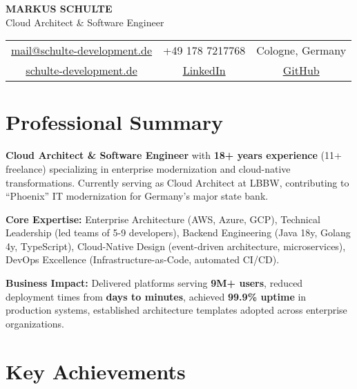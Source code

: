 \documentclass[10pt,a4paper]{article}
\begin{document}
\begin{center}
{\LARGE\bfseries\color{headercolor} MARKUS SCHULTE} \\[4pt]
{\large Cloud Architect \& Software Engineer} \\[8pt]
\begin{tabular}{c|c|c}
\href{mailto:mail@schulte-development.de}{mail@schulte-development.de} & 
+49 178 7217768 & 
Cologne, Germany \\
\href{https://schulte-development.de}{schulte-development.de} & 
\href{https://www.linkedin.com/in/markus-schulte/}{LinkedIn} & 
\href{https://github.com/SchulteDev}{GitHub}
\end{tabular}
\end{center}

\vspace{8pt}

\section{Professional Summary}

\textbf{Cloud Architect \& Software Engineer} with \textbf{18+ years experience} (11+ freelance) specializing in enterprise modernization and cloud-native transformations. Currently serving as Cloud Architect at LBBW, contributing to ``Phoenix'' IT modernization for Germany's major state bank.

\textbf{Core Expertise:} Enterprise Architecture (AWS, Azure, GCP), Technical Leadership (led teams of 5-9 developers), Backend Engineering (Java 18y, Golang 4y, TypeScript), Cloud-Native Design (event-driven architecture, microservices), DevOps Excellence (Infrastructure-as-Code, automated CI/CD).

\textbf{Business Impact:} Delivered platforms serving \textbf{9M+ users}, reduced deployment times from \textbf{days to minutes}, achieved \textbf{99.9\% uptime} in production systems, established architecture templates adopted across enterprise organizations.

\vspace{6pt}

\section{Key Achievements}
\end{document}
